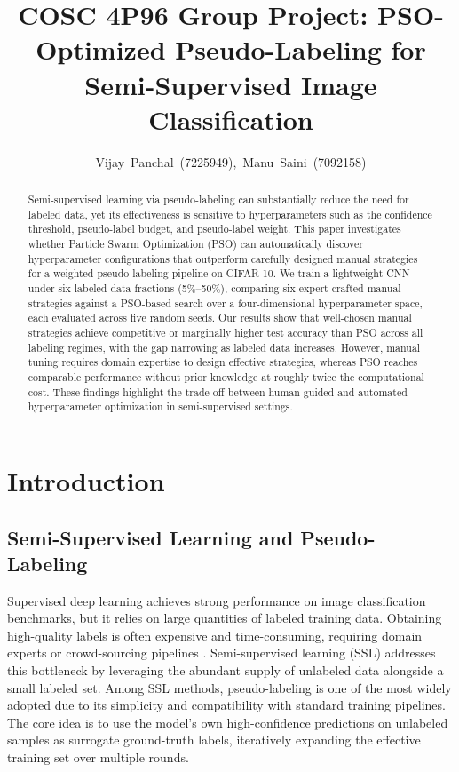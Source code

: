 \documentclass[journal]{IEEEtran}
\begin{document}
\title{COSC 4P96 Group Project: PSO-Optimized Pseudo-Labeling for
Semi-Supervised Image Classification}

\author{Vijay~Panchal~(7225949),~Manu~Saini~(7092158)}

\maketitle


\begin{abstract}
Semi-supervised learning via pseudo-labeling \cite{lee2013pseudolabel} can
substantially reduce the need for labeled data, yet its effectiveness is
sensitive to hyperparameters such as the confidence threshold, pseudo-label
budget, and pseudo-label weight. This paper investigates whether Particle
Swarm Optimization (PSO) \cite{kennedy1995pso} can automatically discover
hyperparameter configurations that outperform carefully designed manual
strategies for a weighted pseudo-labeling pipeline on CIFAR-10. We train a
lightweight CNN under six labeled-data fractions (5\%--50\%), comparing six
expert-crafted manual strategies against a PSO-based search over a
four-dimensional hyperparameter space, each evaluated across five random
seeds. Our results show that well-chosen manual strategies achieve
competitive or marginally higher test accuracy than PSO across all labeling
regimes, with the gap narrowing as labeled data increases. However, manual
tuning requires domain expertise to design effective strategies, whereas PSO
reaches comparable performance without prior knowledge at roughly twice the
computational cost. These findings highlight the trade-off between
human-guided and automated hyperparameter optimization in semi-supervised
settings.
\end{abstract}

\IEEEpeerreviewmaketitle


\section{Introduction}

\subsection{Semi-Supervised Learning and Pseudo-Labeling}

Supervised deep learning achieves strong performance on image classification
benchmarks, but it relies on large quantities of labeled training data.
Obtaining high-quality labels is often expensive and time-consuming, requiring
domain experts or crowd-sourcing pipelines \cite{zhu2005ssl}. Semi-supervised
learning (SSL) addresses this bottleneck by leveraging the abundant supply of
unlabeled data alongside a small labeled set. Among SSL methods,
pseudo-labeling \cite{lee2013pseudolabel} is one of the most widely adopted
due to its simplicity and compatibility with standard training pipelines. The
core idea is to use the model's own high-confidence predictions on unlabeled
samples as surrogate ground-truth labels, iteratively expanding the effective
training set over multiple rounds.
\end{document}

